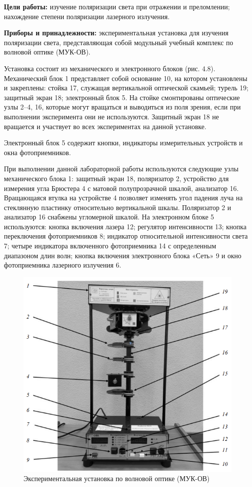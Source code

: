 \textbf{Цели работы:} изучение поляризации света при отражении и преломлении; нахождение степени поляризации лазерного излучения.

\textbf{Приборы и принадлежности:} экспериментальная установка для изучения поляризации света, представляющая собой модульный учебный комплекс по волновой оптике (МУК-ОВ).

Установка состоит из механического и электронного блоков (рис. 4.8). Механический блок 1 представляет собой основание 10, на котором установлены и закреплены: стойка 17, служащая вертикальной оптической скамьей; турель 19; защитный экран 18; электронный блок 5. На стойке смонтированы оптические узлы 2--4, 16, которые могут вращаться и выводиться из поля зрения, если при выполнении эксперимента они не используются. Защитный экран 18 не вращается и участвует во всех экспериментах на данной установке.

Электронный блок 5 содержит кнопки, индикаторы измерительных устройств и окна фотоприемников.

При выполнении данной лабораторной работы используются следующие узлы механического блока 1: защитный экран 18, поляризатор 2, устройство для измерения угла Брюстера 4 с матовой полупрозрачной шкалой, анализатор 16. Вращающаяся втулка на устройстве 4 позволяет изменять угол падения луча на стеклянную пластинку относительно вертикальной шкалы. Поляризатор 2 и анализатор 16 снабжены угломерной шкалой. На электронном блоке 5 используются: кнопка включения лазера 12; регулятор интенсивности 13; кнопка переключения фотоприемников 8; индикатор относительной интенсивности света 7; четыре индикатора включенного фотоприемника 14 с определенным диапазоном длин волн; кнопка включения электронного блока «Сеть» 9 и окно фотоприемника лазерного излучения 6.

\begin{figure}[H]
    \def\thefigure{4.8}
    \protect{} 
	
    \centering
    \includegraphics[width=0.8\linewidth]{figs/1.png}
	\caption{Экспериментальная установка по волновой оптике (МУК-ОВ)}
	\label{fig:exp_setup}
\end{figure}

